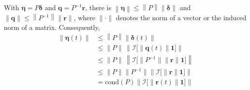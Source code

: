 \documentclass[accepted]{uai2023}
\newcommand{\vect}[1]{\mathbf{#1}}
\newcommand{\Err}{\eta}
\newcommand{\I}{\mathcal{I}}
\begin{document}
    With $\pmb{\Err} = P \pmb{\delta}$ and $\vect{q} = P^{-1}\vect{r}$, there is $\left\|\pmb{\Err}\right\| \leq \left\|P\right\| \|\pmb{\delta}\|$ and $\|\vect{q}\| \leq \left\|P^{-1}\right\| \|\vect{r}\|$, where $\|\cdot\|$ denotes the norm of a vector or the induced norm of a matrix. Consequently,
    \begin{align}
        \left\|\pmb{\Err}(t)\right\| &\leq \left\|P\right\| \|\pmb{\delta}(t)\| \\
        &\leq \|P\|\, \left\|\pmb{\I}\Big[\|\vect{q}(t)\|\vect{1}\Big]\right\|\\
        &\leq \|P\|\, \left\|\pmb{\I}\Big[\|P^{-1}\| \|\vect{r}\|\vect{1}\Big]\right\|\\
        &\leq \|P\|\|P^{-1}\| \left\|\pmb{\I}\Big[\|\vect{r}\|\vect{1}\Big]\right\|\\
        &=\mathrm{cond}(P)\left\|\pmb{\I}\Big[\|\vect{r}(t)\|\vect{1}\Big]\right\| 
    \end{align}

    
\end{document}
